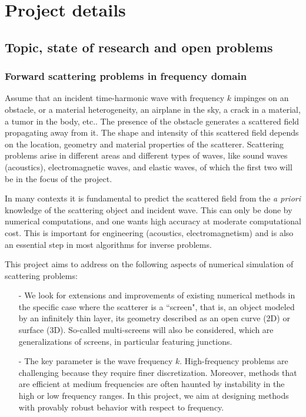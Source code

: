 \documentclass[]{report}
\newcommand{\ma}[1]{{\color{green}#1}}
\begin{document}
\section{Project details}

\subsection{Topic, state of research and open problems}

\subsubsection*{Forward scattering problems in frequency domain}	

Assume that an incident time-harmonic wave with frequency $k$ impinges on an obstacle, or
a material heterogeneity, an airplane in the sky, a crack in a material, a tumor in the
body, etc.. The presence of the obstacle generates a scattered field propagating away
\ma{from} it. The shape and intensity of this scattered field depends on the location, geometry and
material properties of the scatterer. Scattering problems arise in different areas and
different types of waves, like sound waves (acoustics), electromagnetic waves, and elastic
waves, of which the first two will be in the focus of the project. 

In many contexts it is fundamental to predict the scattered field from the \textit{a
  priori} knowledge of the scattering object and incident wave. This can only be done by
numerical computations, and one wants high accuracy at moderate computational cost. This
is important for engineering (acoustics, electromagnetism) and is also an essential step
in most algorithms for inverse problems.

This project aims to address on the following aspects of numerical simulation of
scattering problems:
\begin{itemize}
\item[-] We look for extensions and improvements of existing numerical methods in the
  specific case where the scatterer is a ``screen", that is, an object modeled by an
  infinitely thin layer, its geometry described as an open curve (2D) or surface
  (3D). So-called multi-screens will also be considered, which are generalizations of
  screens, in particular featuring junctions.
\item[-] The key parameter is the wave frequency $k$. High-frequency problems are
  challenging because they require finer discretization. Moreover, methods that are
  efficient at medium frequencies are often haunted by instability in the high or low
  frequency ranges. In this project, we aim at designing methods with provably robust
  behavior with respect to frequency.
\end{itemize}
\end{document}
